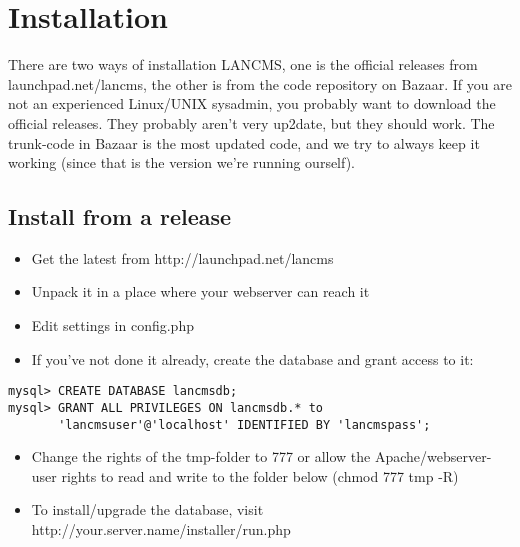 \chapter{Installation}

There are two ways of installation LANCMS, one is the official releases from launchpad.net/lancms, the other is from the code repository on Bazaar.
If you are not an experienced Linux/UNIX sysadmin, you probably want to download the official releases. They probably aren't very up2date, but they should work.
The trunk-code in Bazaar is the most updated code, and we try to always keep it working (since that is the version we're running ourself).

\section{Install from a release}
\begin{itemize}
\item Get the latest from http://launchpad.net/lancms
\item Unpack it in a place where your webserver can reach it
\item Edit settings in config.php
\item If you've not done it already, create the database and grant access to it:
\end{itemize}
\begin{lstlisting}
mysql> CREATE DATABASE lancmsdb;
mysql> GRANT ALL PRIVILEGES ON lancmsdb.* to
       'lancmsuser'@'localhost' IDENTIFIED BY 'lancmspass';
\end{lstlisting}
\begin{itemize}
\item Change the rights of the tmp-folder to 777 or allow the Apache/webserver-user rights to read and write to the folder below (chmod 777 tmp -R)
\item To install/upgrade the database, visit http://your.server.name/installer/run.php
\end{itemize}

